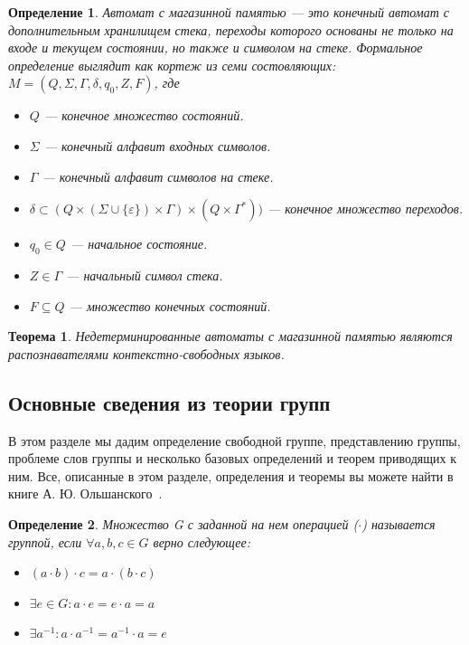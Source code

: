 \documentclass[14pt]{matmex-diploma-custom}
\newtheorem{thm}{Теорема}[subsection]
\newtheorem{defn}{Определение}[subsection]
\begin{document}
\begin{defn}
Автомат с магазинной памятью --- это конечный автомат с дополнительным хранилищем стека, 
переходы которого основаны не только на входе и текущем состоянии, но также и символом на стеке. 
Формальное определение выглядит как кортеж из семи состовляющих:
$M=(Q,\Sigma ,\Gamma ,\delta ,q_{0},Z,F)$, где
\begin{itemize}
    \item $Q$ --- конечное множество состояний.
    \item $\Sigma$ --- конечный алфавит входных символов. 
    \item $\Gamma$ --- конечный алфавит символов на стеке.
    \item $\delta \subset (Q \times (\Sigma \cup \{\varepsilon \})\times \Gamma) \times (Q\times \Gamma^{*}))$ --- конечное множество переходов.
    \item $q_{0}\in Q$ --- начальное состояние.
    \item $Z\in \Gamma$ --- начальный символ стека.
    \item $F\subseteq Q$ --- множество конечных состояний.
\end{itemize}
\end{defn}

\begin{thm} \label{thmpda}
Недетерминированные автоматы с магазинной памятью являются распознавателями контекстно-свободных языков.
\end{thm}

\subsection{Основные сведения из теории групп}

В этом разделе мы дадим определение свободной группе, представлению группы,
проблеме слов группы и несколько базовых определений и теорем приводящих к ним. Все, описанные в этом
разделе, определения и теоремы вы можете найти в книге А. Ю. Ольшанского~\cite{geomTheoryGroup}.

\begin{defn}
Множество G с заданной на нем операцией ($ \cdot $) называется группой, если $ \forall a, b, c \in G $
верно следующее:
\begin{itemize}
\item $(a \cdot b) \cdot c = a \cdot (b \cdot c)$
\item $\exists e \in G : a \cdot e = e \cdot a = a$
\item $\exists a^{-1} : a \cdot a^{-1} = a^{-1} \cdot a = e$
\end{itemize}
\end{defn}
\end{document}
